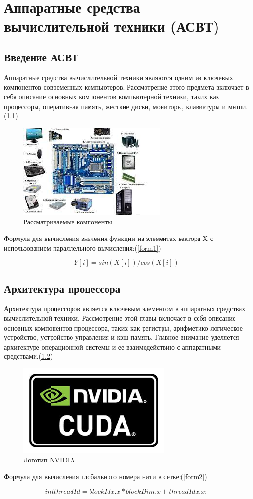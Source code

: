 \documentclass[a4paper, 14pt]{report}
\begin{document}
	\chapter{Аппаратные средства вычислительной техники (АСВТ)}
	\section{Введение АСВТ}
	Аппаратные средства вычислительной техники являются одним из ключевых компонентов современных компьютеров. Рассмотрение этого предмета включает в себя описание основных компонентов компьютерной техники, таких как процессоры, оперативная память, жесткие диски, мониторы, клавиатуры и мыши.(\ref{cuda1})
	
	\begin{figure}[h]
		\centering
		\includegraphics[scale=0.7]{cudaOne}
		\caption{Рассматриваемые компоненты}
		\label{cuda1}
	\end{figure}
	
	Формула для вычисления значения функции на элементах вектора X с использованием параллельного вычисления:(\ref{form1})
	
	\begin{equation}
		Y[i] = sin(X[i]) / cos(X[i])
		\label{form1}
	\end{equation}
	
	\section{Архитектура процессора}
	Архитектура процессоров является ключевым элементом в аппаратных средствах вычислительной техники. Рассмотрение этой главы включает в себя описание основных компонентов процессора, таких как регистры, арифметико-логическое устройство, устройство управления и кэш-память. Главное внимание уделяется архитектуре операционной системы и ее взаимодействию с аппаратными средствами.(\ref{cuda2})
	
	\begin{figure}[h]
		\centering
		\includegraphics[scale=0.7]{cuda.png}
		\caption{Логотип NVIDIA}
		\label{cuda2}
	\end{figure}
	
	Формула для вычисления глобального номера нити в сетке:(\ref{form2})
	
	\begin{equation}
		int threadId = blockIdx.x *blockDim.x + threadIdx.x;
		\label{form2}
	\end{equation}
	
	
	
\end{document}
